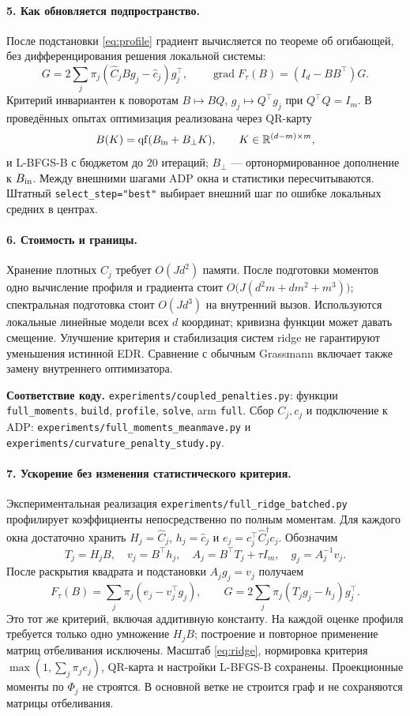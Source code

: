 \documentclass[11pt,a4paper]{article}
\newcommand{\R}{\mathbb R}
\newcommand{\code}[1]{\nolinkurl{#1}}
\begin{document}
\paragraph{5. Как обновляется подпространство.}
После подстановки \eqref{eq:profile} градиент вычисляется по теореме
об огибающей, без дифференцирования решения локальной системы:
\[
 G=2\sum_j\pi_j(\widehat C_jBg_j-\widehat c_j)g_j^\top,
 \qquad \operatorname{grad}F_\tau(B)=(I_d-BB^\top)G.
\]
Критерий инвариантен к поворотам $B\mapsto BQ$, $g_j\mapsto Q^\top g_j$
при $Q^\top Q=I_m$. В проведённых опытах оптимизация реализована через
QR-карту
\[
 B(K)=\operatorname{qf}(B_{\rm in}+B_\perp K),\qquad
 K\in\R^{(d-m)\times m},
\]
и L-BFGS-B с бюджетом до 20 итераций; $B_\perp$ --- ортонормированное
дополнение к $B_{\rm in}$. Между внешними шагами ADP окна и статистики
пересчитываются. Штатный \code{select_step="best"} выбирает внешний шаг
по ошибке локальных средних в центрах.

\paragraph{6. Стоимость и границы.}
Хранение плотных $C_j$ требует $O(Jd^2)$ памяти. После подготовки моментов
одно вычисление профиля и градиента стоит
$O\bigl(J(d^2m+dm^2+m^3)\bigr)$; спектральная подготовка стоит $O(Jd^3)$
на внутренний вызов. Используются локальные линейные модели всех $d$
координат; кривизна функции может давать смещение. Улучшение критерия
и стабилизация систем ridge не гарантируют уменьшения истинной EDR.
Сравнение с обычным Grassmann включает также замену внутреннего оптимизатора.

\smallskip
{\small\textbf{Соответствие коду.}
\code{experiments/coupled_penalties.py}: функции
\code{full_moments}, \code{build}, \code{profile}, \code{solve}, arm \code{full}.
Сбор $C_j,c_j$ и подключение к ADP:
\code{experiments/full_moments_meanmave.py} и
\code{experiments/curvature_penalty_study.py}.}

\paragraph{7. Ускорение без изменения статистического критерия.}
Экспериментальная реализация \code{experiments/full_ridge_batched.py}
профилирует коэффициенты непосредственно по полным моментам. Для каждого
окна достаточно хранить $H_j=\widehat C_j$, $h_j=\widehat c_j$ и
$e_j=c_j^\top\widehat C_j^\dagger c_j$. Обозначим
\[
 T_j=H_jB,\quad v_j=B^\top h_j,\quad
 A_j=B^\top T_j+\tau I_m,\quad g_j=A_j^{-1}v_j.
\]
После раскрытия квадрата и подстановки $A_jg_j=v_j$ получаем
\[
 F_\tau(B)=\sum_j\pi_j(e_j-v_j^\top g_j),\qquad
 G=2\sum_j\pi_j(T_jg_j-h_j)g_j^\top.
\]
Это тот же критерий, включая аддитивную константу. На каждой оценке
профиля требуется только одно умножение $H_jB$; построение и повторное
применение матриц отбеливания исключены. Масштаб \eqref{eq:ridge},
нормировка критерия $\max(1,\sum_j\pi_je_j)$, QR-карта и настройки
L-BFGS-B сохранены. Проекционные моменты по $\Phi_j$ не строятся.
В основной ветке не строится граф и не сохраняются матрицы отбеливания.
\end{document}
